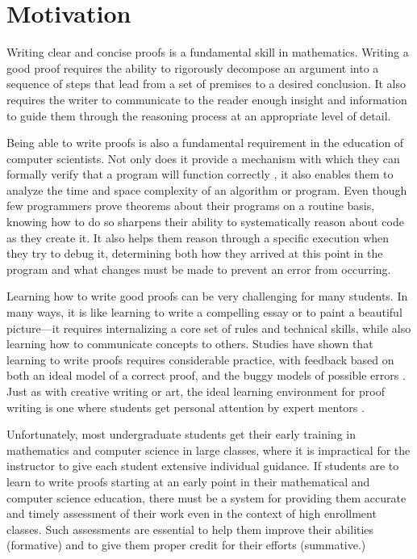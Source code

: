\documentclass[12pt]{article}
\begin{document}
\section{Motivation}

Writing clear and concise proofs is a fundamental skill
in mathematics.  Writing a good proof requires the ability to
rigorously decompose an argument into a sequence of steps that lead
from a set of premises to
a desired conclusion.  It also requires the
writer to communicate to the reader enough insight and information to guide them
through the reasoning process at an appropriate level of detail.

Being able to write proofs is also a fundamental requirement in the
education of computer scientists.  Not only does it provide a
mechanism with which they can formally verify that a program will function
correctly \citep{hoare-cacm69}, it also enables them to analyze the
time and space complexity of an algorithm or program.  Even though few
programmers prove theorems about their programs on a routine basis,
knowing how to do so sharpens their ability to systematically reason
about code as they create it.  It also helps them reason through a
specific execution when they try to debug it, determining both how
they arrived at this point in the program and what changes must be
made to prevent an error from occurring.

Learning how to write good proofs can be very challenging for many
students.  In many ways, it is like learning to write a compelling
essay or to paint a beautiful picture---it requires internalizing a
core set of rules and technical skills, while also learning how to
communicate concepts to others. 
Studies have shown that learning to write proofs requires
considerable practice, with feedback based on both an ideal model of a
correct proof, and the buggy models of possible errors
\citep{anderson-jls95}.  Just as with creative writing or art, the
ideal learning environment for proof writing is one where students get
personal attention by expert mentors \citep{anderson-ijcai85}.

Unfortunately, most undergraduate students get their early training in
mathematics and computer science in large classes, where it is
impractical for the instructor to give each student extensive
individual guidance.  If students are to learn to write proofs
starting at an early point in their mathematical and computer science
education, there must be a system for providing them accurate and
timely assessment of their work even in the context of high enrollment
classes.  Such assessments are essential to help them improve their
abilities (formative) and to give them proper credit for their efforts
(summative.)
\end{document}
